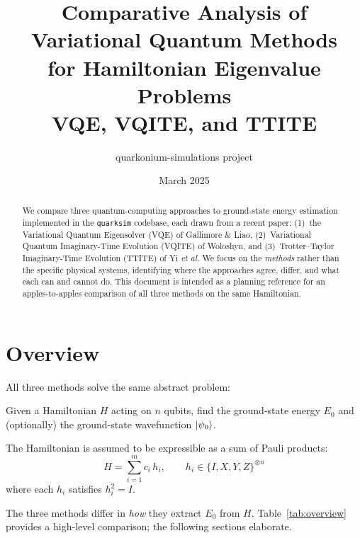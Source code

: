 \documentclass[11pt,a4paper]{article}
\title{Comparative Analysis of Variational Quantum Methods\\
  for Hamiltonian Eigenvalue Problems\\[0.5em]
  \large VQE, VQITE, and TTITE}
\author{quarkonium-simulations project}
\date{March 2025}
\begin{document}
\maketitle

\begin{abstract}
We compare three quantum-computing approaches to ground-state energy
estimation implemented in the \texttt{quarksim} codebase, each drawn from a
recent paper:
(1)~the Variational Quantum Eigensolver (VQE) of Gallimore \& Liao,
(2)~Variational Quantum Imaginary-Time Evolution (VQITE) of Woloshyn, and
(3)~Trotter--Taylor Imaginary-Time Evolution (TTITE) of Yi \emph{et al.}
We focus on the \emph{methods} rather than the specific physical systems,
identifying where the approaches agree, differ, and what each can and
cannot do.  This document is intended as a planning reference for an
apples-to-apples comparison of all three methods on the same Hamiltonian.
\end{abstract}

\tableofcontents
\newpage

\section{Overview}

All three methods solve the same abstract problem:

\begin{keybox}
Given a Hamiltonian $H$ acting on $n$ qubits, find the ground-state
energy $E_0$ and (optionally) the ground-state wavefunction $\ket{\psi_0}$.
\end{keybox}

\noindent The Hamiltonian is assumed to be expressible as a sum of Pauli
products:
\begin{equation}
  H = \sum_{i=1}^{m} c_i\, h_i, \qquad h_i \in \{I, X, Y, Z\}^{\otimes n}
  \label{eq:pauli_decomp}
\end{equation}
where each $h_i$ satisfies $h_i^2 = I$.

The three methods differ in \emph{how} they extract $E_0$ from $H$.
Table~\ref{tab:overview} provides a high-level comparison; the following
sections elaborate.
\end{document}
